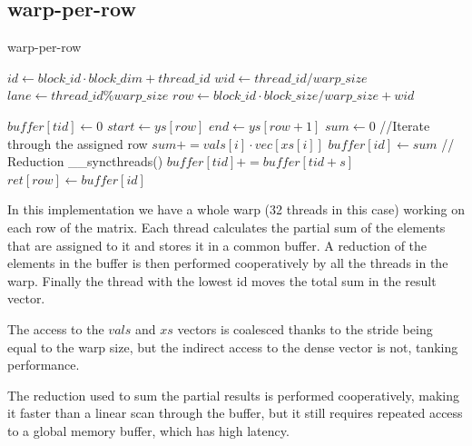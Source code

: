 \documentclass[conference]{IEEEtran}
\begin{document}
\subsection{warp-per-row}
\begin{algorithm}[ht!]
    \caption{warp-per-row}
    \begin{algorithmic}[1]
        \State $id \gets block\_id \cdot block\_dim + thread\_id$
        \State $wid \gets thread\_id / warp\_size$
        \State $lane \gets thread\_id \% warp\_size$
        \State $row \gets block\_id \cdot block\_size / warp\_size + wid$

        \State $buffer[tid] \gets 0$ 
        \State $start \gets ys[row]$
        \State $end\gets ys[row+1]$
        \State $sum \gets 0$
        \State //Iterate through the assigned row
        \State $sum += vals[i]\cdot vec[xs[i]]$
        \EndFor
        \State $buffer[id] \gets sum$
        \EndIf
        \State // Reduction
        \State \_\_syncthreads()
        \State $buffer[tid] += buffer[tid+s]$
        \EndIf
        \EndFor
            \State $ret[row] \gets buffer[id]$
        \EndIf
        \EndProcedure
    \end{algorithmic}
    \label{algo:warprow}
\end{algorithm}
In this implementation we have a whole warp (32 threads in this case) working on each row of the matrix. Each thread calculates the partial sum of the elements that are assigned to it and stores it in a common buffer. A reduction of the elements in the buffer is then performed cooperatively by all the threads in the warp. Finally the thread with the lowest id moves the total sum in the result vector.

The access to the $vals$ and $xs$ vectors is coalesced thanks to the stride being equal to the warp size, but the indirect access to the dense vector is not, tanking performance.

The reduction used to sum the partial results is performed cooperatively, making it faster than a linear scan through the buffer, but it still requires repeated access to a global memory buffer, which has high latency.
\end{document}
